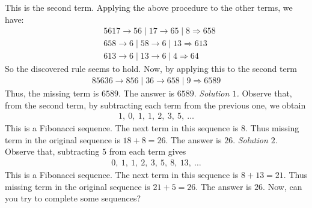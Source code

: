 \begin{multicols}{2}
	This is the second term. 
	\vskip 0.05cm
	Applying the above procedure to the other terms, we have:
	\begin{align*}
		&5617 \rightarrow 56 \mid 17 \rightarrow 65 \mid 8 \Longrightarrow 658\\[-0.5ex]
		&658 \rightarrow 6 \mid 58 \rightarrow 6 \mid 13 \Longrightarrow 613\\[-0.5ex]
		&613 \rightarrow 6 \mid 13 \rightarrow 6 \mid 4 \Longrightarrow 64
	\end{align*}
	So the discovered rule seems to hold. Now, by applying this to the second term
	\begin{align*}
		85636 \rightarrow 856 \mid 36 \rightarrow 658 \mid 9 \Longrightarrow 6589
	\end{align*}
	Thus, the missing term is $6589.$ The answer is $6589$.
	\vskip 0.05cm
	\vskip 0.05cm
	\textit{Solution $1$.} Observe that, from the second term, by subtracting each term from the previous one, we obtain
		\begin{align*}
			1,\ 0,\ 1,\ 1,\ 2,\ 3,\ 5,\ \ldots	
		\end{align*}	
		This is a Fibonacci sequence. The next term in this sequence is $8.$ 
		Thus missing term in the original sequence is $18+8=26.$
		The answer is $26$.
	\vskip 0.05cm
	\textit{Solution $2$.}
	Observe that, subtracting $5$ from each term gives 
	\begin{align*}
		0,\ 1,\ 1,\ 2,\ 3,\ 5,\ 8,\ 13,\ \ldots
	\end{align*}
	This is a Fibonacci sequence. The next term in this sequence is $8+13=21.$ 
	Thus missing term in the original sequence is $21+5=26.$
	The answer is $26$.
	\vskip 0.05cm
	Now, can you try to complete some sequences?
	\vskip 0.05cm


\end{multicols}
